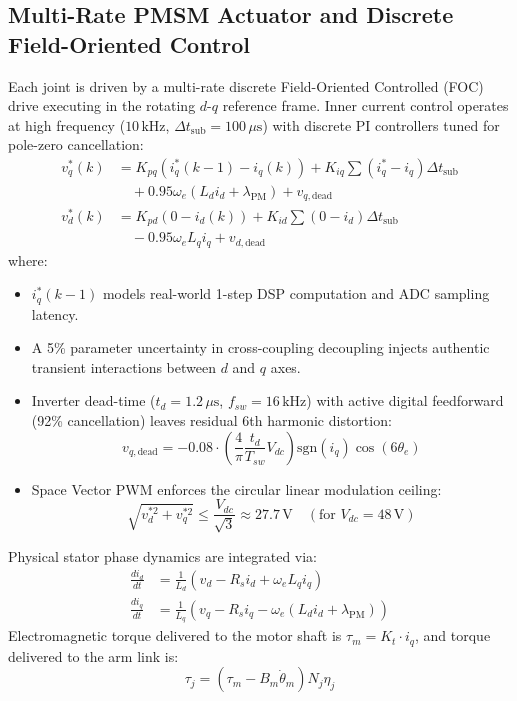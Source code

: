 \documentclass[journal,10pt,twocolumn]{IEEEtran}
\begin{document}
\subsection{Multi-Rate PMSM Actuator and Discrete Field-Oriented Control}
Each joint is driven by a multi-rate discrete Field-Oriented Controlled (FOC) drive executing in the rotating $d$-$q$ reference frame. Inner current control operates at high frequency ($10\,\text{kHz}$, $\Delta t_{\text{sub}} = 100\,\mu\text{s}$) with discrete PI controllers tuned for pole-zero cancellation:
\begin{align}
    v_q^*(k) &= K_{pq}(i_q^*(k-1) - i_q(k)) + K_{iq} \sum (i_q^* - i_q)\Delta t_{\text{sub}} \nonumber \\
    &\quad + 0.95 \omega_e (L_d i_d + \lambda_{\text{PM}}) + v_{q,\text{dead}} \\
    v_d^*(k) &= K_{pd}(0 - i_d(k)) + K_{id} \sum (0 - i_d)\Delta t_{\text{sub}} \nonumber \\
    &\quad - 0.95 \omega_e L_q i_q + v_{d,\text{dead}}
\end{align}
where:
\begin{itemize}
    \item $i_q^*(k-1)$ models real-world 1-step DSP computation and ADC sampling latency.
    \item A 5\% parameter uncertainty in cross-coupling decoupling injects authentic transient interactions between $d$ and $q$ axes.
    \item Inverter dead-time ($t_d = 1.2\,\mu\text{s}$, $f_{sw} = 16\,\text{kHz}$) with active digital feedforward (92\% cancellation) leaves residual 6th harmonic distortion:
    \begin{equation}
        v_{q,\text{dead}} = -0.08 \cdot \left(\frac{4}{\pi} \frac{t_d}{T_{sw}} V_{dc}\right) \text{sgn}(i_q) \cos(6\theta_e)
    \end{equation}
    \item Space Vector PWM enforces the circular linear modulation ceiling:
    \begin{equation}
        \sqrt{v_d^{*2} + v_q^{*2}} \le \frac{V_{dc}}{\sqrt{3}} \approx 27.7\,\text{V} \quad (\text{for } V_{dc} = 48\,\text{V})
    \end{equation}
\end{itemize}

Physical stator phase dynamics are integrated via:
\begin{align}
    \frac{di_d}{dt} &= \frac{1}{L_d}(v_d - R_s i_d + \omega_e L_q i_q) \\
    \frac{di_q}{dt} &= \frac{1}{L_q}(v_q - R_s i_q - \omega_e(L_d i_d + \lambda_{\text{PM}}))
\end{align}
Electromagnetic torque delivered to the motor shaft is $\tau_m = K_t \cdot i_q$, and torque delivered to the arm link is:
\begin{equation}
    \tau_j = (\tau_m - B_m \dot{\theta}_m) N_j \eta_j
\end{equation}
\end{document}
